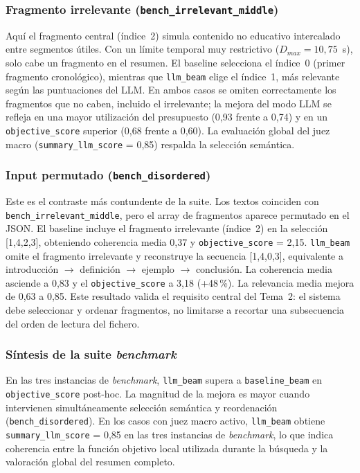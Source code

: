 \documentclass[12pt,a4paper]{article}
\begin{document}
\subsubsection{Fragmento irrelevante (\texttt{bench\_irrelevant\_middle})}

Aquí el fragmento central (índice~2) simula contenido no educativo intercalado entre segmentos útiles. Con un límite temporal muy restrictivo (\(D_{max}=10{,}75\)~s), solo cabe un fragmento en el resumen. El baseline selecciona el índice~0 (primer fragmento cronológico), mientras que \texttt{llm\_beam} elige el índice~1, más relevante según las puntuaciones del LLM. En ambos casos se omiten correctamente los fragmentos que no caben, incluido el irrelevante; la mejora del modo LLM se refleja en una mayor utilización del presupuesto (0{,}93 frente a 0{,}74) y en un \texttt{objective\_score} superior (0{,}68 frente a 0{,}60). La evaluación global del juez macro (\texttt{summary\_llm\_score} = 0{,}85) respalda la selección semántica.

\subsubsection{Input permutado (\texttt{bench\_disordered})}

Este es el contraste más contundente de la suite. Los textos coinciden con \texttt{bench\_irrelevant\_middle}, pero el array de fragmentos aparece permutado en el JSON. El baseline incluye el fragmento irrelevante (índice~2) en la selección [1,4,2,3], obteniendo coherencia media 0{,}37 y \texttt{objective\_score} = 2{,}15. \texttt{llm\_beam} omite el fragmento irrelevante y reconstruye la secuencia [1,4,0,3], equivalente a introducción $\rightarrow$ definición $\rightarrow$ ejemplo $\rightarrow$ conclusión. La coherencia media asciende a 0{,}83 y el \texttt{objective\_score} a 3{,}18 (+48\,\%). La relevancia media mejora de 0{,}63 a 0{,}85. Este resultado valida el requisito central del Tema~2: el sistema debe seleccionar y ordenar fragmentos, no limitarse a recortar una subsecuencia del orden de lectura del fichero.

\subsubsection{Síntesis de la suite \textit{benchmark}}

En las tres instancias de \textit{benchmark}, \texttt{llm\_beam} supera a \texttt{baseline\_beam} en \texttt{objective\_score} post-hoc. La magnitud de la mejora es mayor cuando intervienen simultáneamente selección semántica y reordenación (\texttt{bench\_disordered}). En los casos con juez macro activo, \texttt{llm\_beam} obtiene \texttt{summary\_llm\_score} = 0{,}85 en las tres instancias de \textit{benchmark}, lo que indica coherencia entre la función objetivo local utilizada durante la búsqueda y la valoración global del resumen completo.
\end{document}
